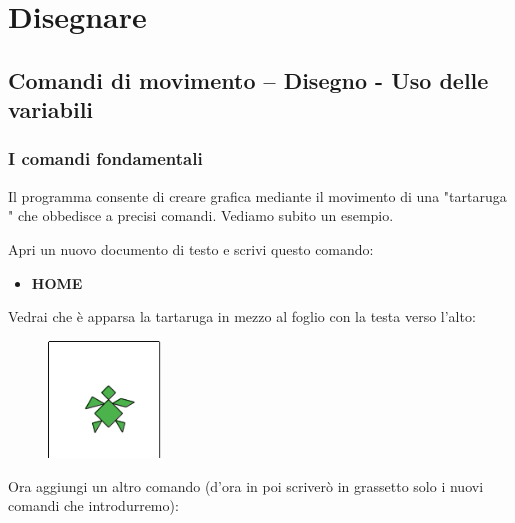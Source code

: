 \chapter{Disegnare} \label{cap:disegnare}

\section{Comandi di movimento – Disegno - Uso delle variabili}

\subsection{I comandi fondamentali} \label{sec:comandi-fondamentali}

Il programma consente di creare grafica mediante il movimento di una  "tartaruga " che obbedisce a precisi comandi. Vediamo subito un esempio.

Apri un nuovo documento di testo e scrivi questo comando:

\vskip 1cm

\begin{scriptsize}
\begin{minipage}{01.0\textwidth}
\begin{itemize}[itemsep=-3pt,parsep=2pt]
\item[] \hspace{0.5cm} \textbf{HOME} 
\end{itemize}
\end{minipage}
\end{scriptsize}

\vskip 1cm

Vedrai che è apparsa la tartaruga in mezzo al foglio con la testa verso l'alto:

\begin{figure}[H]
   \centering
   \includegraphics[width=3.0cm,trim=4 4 8 4,clip]{./images/disegnare/disegnare-1.png}
   \label{dis-1}
\end{figure}

Ora aggiungi un altro comando (d'ora in poi scriverò in grassetto solo i nuovi comandi che introdurremo):

